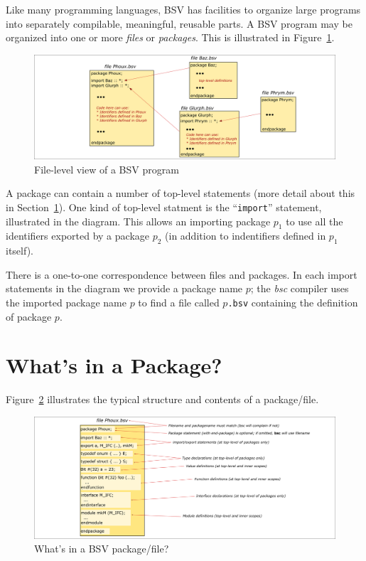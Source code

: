Like many programming languages, BSV has facilities to organize large
programs into separately compilable, meaningful, reusable parts.  A
BSV program may be organized into one or more \emph{files} or
\emph{packages}.  This is illustrated in
Figure~\ref{Fig_BSV_program_structure}.
\begin{figure}[htbp]
  \centerline{\includegraphics[width=6in,angle=0]{Figures/Fig_BSV_program_structure}}
  \caption{\label{Fig_BSV_program_structure}
           File-level view of a BSV program}
\end{figure}

A package can contain a number of top-level statements (more detail
about this in Section~\ref{Sec_package_contents}).  One kind of
top-level statment is the ``\verb|import|'' statement, illustrated in
the diagram.  This allows an importing package $p_1$ to use all the
identifiers exported by a package $p_2$ (in addition to indentifiers
defined in $p_1$ itself).

There is a one-to-one correspondence between files and packages.  In
each import statements in the diagram we provide a package name $p$;
the \emph{bsc} compiler uses the imported package name $p$ to find a
file called $p$\verb|.bsv| containing the definition of package $p$.


\section{What's in a Package?}

\label{Sec_package_contents}

Figure~\ref{Fig_BSV_Package} illustrates the typical
structure and contents of a package/file.
\begin{figure}[htbp]
  \centerline{\includegraphics[width=6in,angle=0]{Figures/Fig_BSV_Package}}
  \caption{\label{Fig_BSV_Package}
           What's in a BSV package/file?}
\end{figure}

